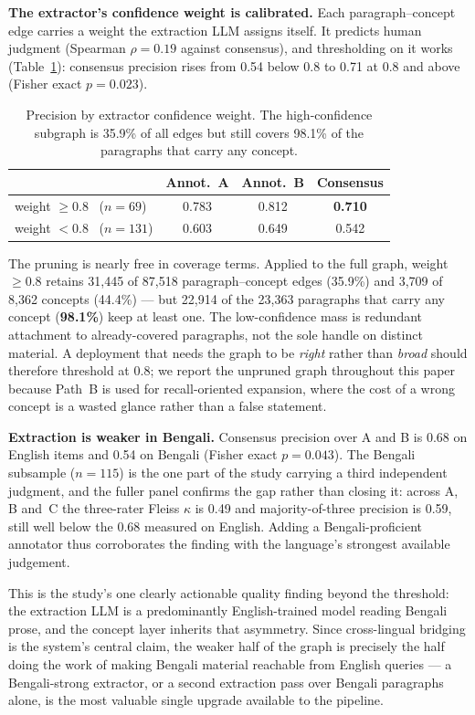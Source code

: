 \documentclass[pdflatex,sn-mathphys-num]{sn-jnl}
\begin{document}
\textbf{The extractor's confidence weight is calibrated.} Each
paragraph--concept edge carries a weight the extraction LLM assigns
itself. It predicts human judgment (Spearman $\rho = 0.19$ against
consensus), and thresholding on it works
(Table~\ref{tab:precision-weight}): consensus precision rises from 0.54
below $0.8$ to 0.71 at $0.8$ and above (Fisher exact $p = 0.023$).

\begin{table}[t]
\centering
\caption{Precision by extractor confidence weight. The high-confidence
subgraph is 35.9\% of all edges but still covers 98.1\% of the
paragraphs that carry any concept.}
\label{tab:precision-weight}
\begin{tabular}{lccc}
\toprule
 & Annot.\ A & Annot.\ B & Consensus\\
\midrule
weight $\geq 0.8$ \ ($n=69$)  & 0.783 & 0.812 & \textbf{0.710}\\
weight $< 0.8$ \ ($n=131$)    & 0.603 & 0.649 & 0.542\\
\bottomrule
\end{tabular}
\end{table}

The pruning is nearly free in coverage terms. Applied to the full graph,
weight $\geq 0.8$ retains 31{,}445 of 87{,}518 paragraph--concept edges
(35.9\%) and 3{,}709 of 8{,}362 concepts (44.4\%) --- but
22{,}914 of the 23{,}363 paragraphs that carry any concept
(\textbf{98.1\%}) keep at least one. The low-confidence mass is
redundant attachment to already-covered paragraphs, not the sole
handle on distinct material. A deployment that needs the graph to be
\emph{right} rather than \emph{broad} should therefore threshold at
$0.8$; we report the unpruned graph throughout this paper because Path~B
is used for recall-oriented expansion, where the cost of a wrong concept
is a wasted glance rather than a false statement.

\textbf{Extraction is weaker in Bengali.} Consensus precision over A and
B is 0.68 on English items and 0.54 on Bengali (Fisher exact
$p = 0.043$). The Bengali subsample ($n = 115$) is the one part of the
study carrying a third independent judgment, and the fuller panel
confirms the gap rather than closing it: across A, B and~C the
three-rater Fleiss $\kappa$ is 0.49 and majority-of-three precision is
0.59, still well below the 0.68 measured on English. Adding a
Bengali-proficient annotator thus corroborates the finding with the
language's strongest available judgement.

This is the study's one clearly actionable quality finding beyond the
threshold: the extraction LLM is a predominantly English-trained model
reading Bengali prose, and the concept layer inherits that asymmetry.
Since cross-lingual bridging is the system's central claim, the weaker
half of the graph is precisely the half doing the work of making Bengali
material reachable from English queries --- a Bengali-strong extractor,
or a second extraction pass over Bengali paragraphs alone, is the most
valuable single upgrade available to the pipeline.
\end{document}
